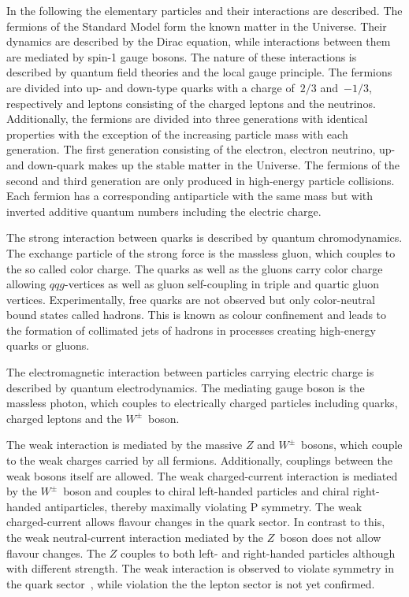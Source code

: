 In the following the elementary particles and their interactions are described.
The fermions of the Standard Model form the known matter in the Universe. Their
dynamics are described by the Dirac equation, while interactions between them
are mediated by spin-1 gauge bosons. The nature of these interactions is
described by quantum field theories and the local gauge principle. The fermions
are divided into up- and down-type quarks with a charge of~$2/3$ and~$-1/3$,
respectively and leptons consisting of the charged leptons and the neutrinos.
Additionally, the fermions are divided into three generations with identical
properties with the exception of the increasing particle mass with each
generation. The first generation consisting of the electron, electron neutrino,
up- and down-quark makes up the stable matter in the Universe. The fermions of
the second and third generation are only produced in high-energy particle
collisions. Each fermion has a corresponding antiparticle with the same mass but
with inverted additive quantum numbers including the electric charge.

The strong interaction between quarks is described by quantum chromodynamics.
The exchange particle of the strong force is the massless gluon, which couples
to the so called color charge. The quarks as well as the gluons carry color
charge allowing $qqg$-vertices as well as gluon self-coupling in triple and
quartic gluon vertices. Experimentally, free quarks are not observed but only
color-neutral bound states called hadrons. This is known as colour confinement
and leads to the formation of collimated jets of hadrons in processes creating
high-energy quarks or gluons.

The electromagnetic interaction between particles carrying electric charge is
described by quantum electrodynamics. The mediating gauge boson is the massless
photon, which couples to electrically charged particles including quarks,
charged leptons and the $W^\pm$~boson.

The weak interaction is mediated by the massive $Z$ and $W^\pm$~bosons, which
couple to the weak charges carried by all fermions. Additionally, couplings
between the weak bosons itself are allowed. The weak charged-current interaction
is mediated by the $W^\pm$~boson and couples to chiral left-handed particles and
chiral right-handed antiparticles, thereby maximally violating $\text{P}$
symmetry. The weak charged-current allows flavour changes in the quark sector.
In contrast to this, the weak neutral-current interaction mediated by the
$Z$~boson does not allow flavour changes. The $Z$ couples to both left- and
right-handed particles although with different strength. The weak interaction is
observed to violate \cp symmetry in the quark
sector~\cite{cp_violation_quark_sector, cp_violation_quark_sector_2}, while \cp
violation the the lepton sector is not yet confirmed.

